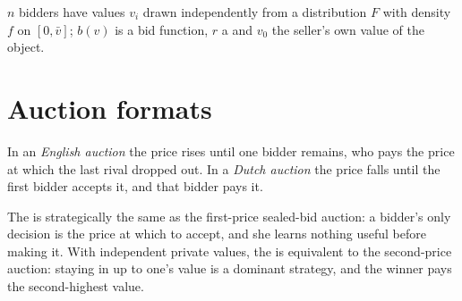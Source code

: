 \begin{notation}\label{not:b3:auctions-and-market-design:symbols}
$n$ bidders have values $v_i$ drawn independently from a distribution $F$ with density $f$
on $[0, \bar v]$; $b(v)$ is a bid function, $r$ a  and $v_0$ the seller's own value
of the object.
\end{notation}

\section{Auction formats}\label{sec:b3:auctions-and-market-design:formats}

\begin{definition}\label{def:b3:auctions-and-market-design:formats}
In an \emph{English auction} the price rises until one bidder remains, who pays the
price at which the last rival dropped out. In a \emph{Dutch auction} the price falls
until the first bidder accepts it, and that bidder pays it.
\end{definition}

The  is strategically the same as the first-price sealed-bid auction: a
bidder's only decision is the price at which to accept, and she learns nothing
useful before making it. With independent private values, the  is
equivalent to the second-price auction: staying in up to one's value is a dominant
strategy, and the winner pays the second-highest value.

\begin{omfigure}
\par{}
\end{omfigure}

